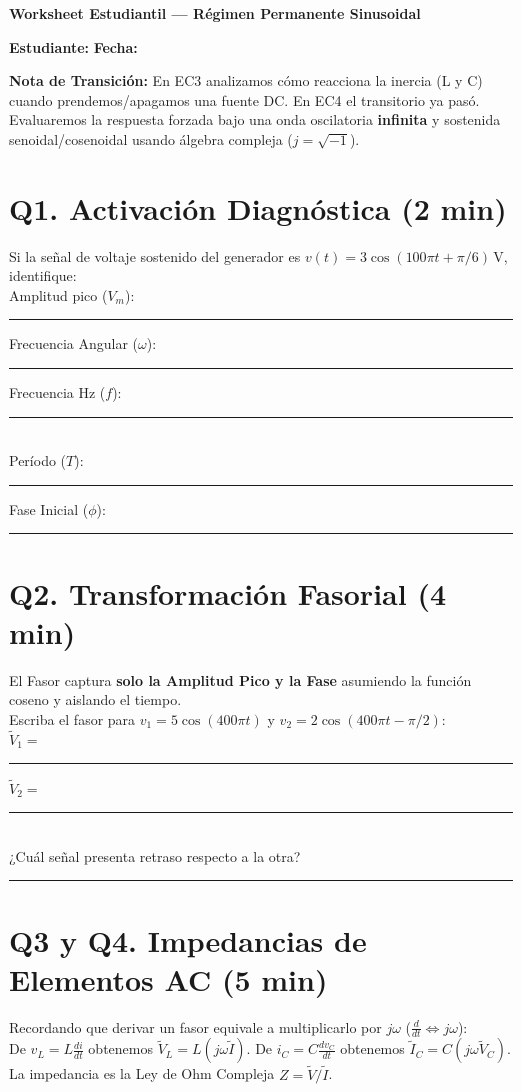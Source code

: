 \documentclass[11pt, a4paper]{article}
\begin{document}
\begin{tcolorbox}[colback=ucbblue!5!white, colframe=ucbblue, title=\textbf{Artefacto A3: Introducción a EC4 (Fasores, Impedancia y Senoides)}]
    \centering \textbf{Worksheet Estudiantil — Régimen Permanente Sinusoidal}
\end{tcolorbox}

\textbf{Estudiante:} \hrulefill \quad \textbf{Fecha:} \hrulefill

\vspace{0.4cm}
\noindent \textbf{Nota de Transición:} En EC3 analizamos cómo reacciona la inercia (L y C) cuando prendemos/apagamos una fuente DC. En EC4 el transitorio ya pasó. Evaluaremos la respuesta forzada bajo una onda oscilatoria \textbf{infinita} y sostenida senoidal/cosenoidal usando álgebra compleja ($j = \sqrt{-1}$).

\section*{Q1. Activación Diagnóstica (2 min)}
Si la señal de voltaje sostenido del generador es $v(t) = 3\cos(100\pi t + \pi/6)\,\text{V}$, identifique: \\
Amplitud pico ($V_m$): \rule{2cm}{0.4pt} \quad Frecuencia Angular ($\omega$): \rule{2cm}{0.4pt} \quad Frecuencia Hz ($f$): \rule{2cm}{0.4pt} \\
Período ($T$): \rule{2cm}{0.4pt} \quad Fase Inicial ($\phi$): \rule{2cm}{0.4pt}

\section*{Q2. Transformación Fasorial (4 min)}
El Fasor captura \textbf{solo la Amplitud Pico y la Fase} asumiendo la función coseno y aislando el tiempo. \\
Escriba el fasor para $v_1 = 5\cos(400\pi t)$ y $v_2 = 2\cos(400\pi t - \pi/2)$: \\
$\tilde{V}_1 =$ \rule{4cm}{0.4pt} \quad $\tilde{V}_2 =$ \rule{4cm}{0.4pt} \\
¿Cuál señal presenta retraso respecto a la otra? \rule{6cm}{0.4pt}

\section*{Q3 y Q4. Impedancias de Elementos AC (5 min)}
Recordando que derivar un fasor equivale a multiplicarlo por $j\omega$ ($\frac{d}{dt} \iff j\omega$): \\
De $v_L = L \frac{di}{dt}$ obtenemos $\tilde{V}_L = L(j\omega\tilde{I})$. De $i_C = C \frac{dv_C}{dt}$ obtenemos $\tilde{I}_C = C(j\omega\tilde{V}_C)$. \\
La impedancia es la Ley de Ohm Compleja $Z = \tilde{V} / \tilde{I}$.
\end{document}

